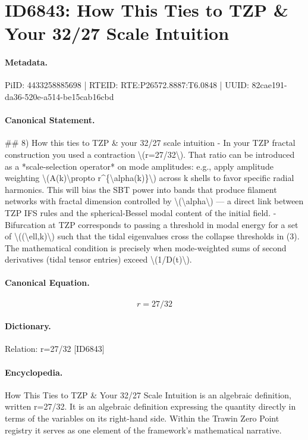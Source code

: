 \section*{ID6843: How This Ties to TZP \& Your 32/27 Scale Intuition}
\paragraph{Metadata.}
PiID: 4433258885698 | RTEID: RTE:P26572.8887:T6.0848 | UUID: 82cae191-da36-520e-a514-be15cab16cbd

\paragraph{Canonical Statement.}
\#\# 8) How this ties to TZP \& your 32/27 scale intuition - In your TZP fractal construction you used a contraction \textbackslash{}(r=27/32\textbackslash{}). That ratio can be introduced as a *scale-selection operator* on mode amplitudes: e.g., apply amplitude weighting \textbackslash{}(A(k)\textbackslash{}propto r\textasciicircum{}\{\textbackslash{}alpha(k)\}\textbackslash{}) across k shells to favor specific radial harmonics. This will bias the SBT power into bands that produce filament networks with fractal dimension controlled by \textbackslash{}(\textbackslash{}alpha\textbackslash{}) — a direct link between TZP IFS rules and the spherical-Bessel modal content of the initial field. - Bifurcation at TZP corresponds to passing a threshold in modal energy for a set of \textbackslash{}((\textbackslash{}ell,k)\textbackslash{}) such that the tidal eigenvalues cross the collapse thresholds in (3). The mathematical condition is precisely when mode-weighted sums of second derivatives (tidal tensor entries) exceed \textbackslash{}(1/D(t)\textbackslash{}).

\paragraph{Canonical Equation.}
\[
r=27/32
\]

\paragraph{Dictionary.}
Relation: r=27/32 [ID6843]

\paragraph{Encyclopedia.}
How This Ties to TZP \& Your 32/27 Scale Intuition is an algebraic definition, written r=27/32. It is an algebraic definition expressing the quantity directly in terms of the variables on its right-hand side. Within the Trawin Zero Point registry it serves as one element of the framework's mathematical narrative.
